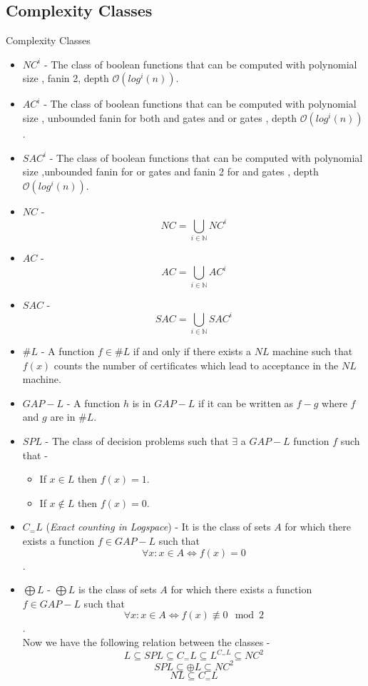 \documentclass{beamer}
\begin{document}
\subsection{Complexity Classes}
\begin{frame}[allowframebreaks]{Complexity Classes}
	\begin{itemize}
		
		\item \textbf{$NC^i$} - The class of boolean functions that can be computed with polynomial size , fanin 2, depth $\mathcal{O}(log^i(n))$.
		\item  \textbf{$AC^i$} - The class of boolean functions that can be computed with polynomial size , unbounded fanin for both and gates and or gates , depth $\mathcal{O}(log^i(n))$.
		\item \textbf{$SAC^i$} - The class of boolean functions that can be computed with polynomial size ,unbounded fanin for or gates and  fanin 2 for and gates , depth $\mathcal{O}(log^i(n))$.
		\item \textbf{$NC$} - $$NC=\bigcup_{i\in \mathbb{N}} NC^i$$ 
		\item \textbf{$AC$} - $$AC=\bigcup_{i\in \mathbb{N}} AC^i$$ 
		\item \textbf{$SAC$} - $$SAC=\bigcup_{i\in \mathbb{N}} SAC^i$$ 
		\item \textbf{$\# L$} - A function $f \in \# L$ if and only if there exists a $NL $ machine such that $f(x)$ counts the number of certificates which lead to acceptance in the $NL $ machine.
		\item \textbf{$GAP-L$} - A function $h$ is in $GAP-L$ if it can be written as $f-g$ where $f$ and $g$ are in $\# L$.
 		\item \textbf{$SPL$} - The class of decision problems such that
		$\exists$ a $GAP-L$ function $f$ such that -
		\begin{itemize}
			\item If $x\in L$ then $f(x)=1$.
			\item If $x\notin L$ then $f(x)=0$.
		\end{itemize} 		
		\item \textbf{$C_{=}L$} (\textit{Exact counting in Logspace}) - It is the class of sets $A$ for which there exists a function $f\in GAP-L$ such that $$\forall x: x\in A \iff f(x)=0$$.
		\item \textbf{$\bigoplus L$} - $\bigoplus L$ is the class of sets $A$ for which there exists a function $f \in GAP-L$ such that 
		$$\forall x : x\in A \iff f(x)\not\equiv 0 \mod 2$$.
		\\
		Now we have the following relation between the classes -
		$$L \subseteq SPL \subseteq C_{=}L \subseteq L^{C_{=}L} \subseteq NC^2 $$ $$SPL \subseteq \oplus L \subseteq NC^2  $$ $$NL \subseteq C_{=}L$$ 
	\end{itemize}
	
	
\end{frame}
\end{document}
